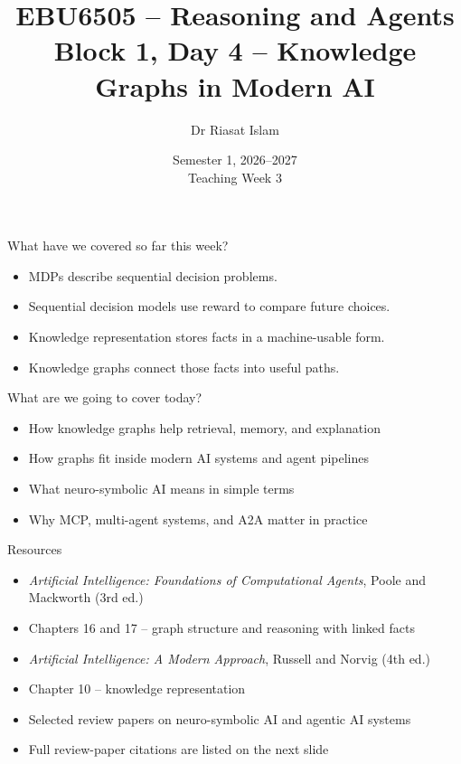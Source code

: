 \documentclass[aspectratio=169]{beamer}
\title[EBU6505 B1 D4]{EBU6505 -- Reasoning and Agents\\Block 1, Day 4 -- Knowledge Graphs in Modern AI}
\author{Dr Riasat Islam}
\institute{Queen Mary University of London}
\date[Teaching Week 3]{Semester 1, 2026--2027 \\ Teaching Week 3}
\newcommand{\defaultdeckrefs}{AIMA4e Ch.10 pp.314--343; Poole3e Ch.16--17 pp.701--766; doi:10.1016/j.cosrev.2026.100902}
\newcommand{\currentsliderefs}{\defaultdeckrefs}
\newcommand{\setslideref}[1]{\gdef\currentsliderefs{#1}}
\begin{document}
\setslideref{AIMA4e Ch.10 pp.314--343; Poole3e Ch.16--17 pp.701--766; doi:10.1016/j.cosrev.2026.100902}
\begin{frame}
  \titlepage
\end{frame}

\begin{frame}{What have we covered so far this week?}
\begin{itemize}
  \item MDPs describe sequential decision problems.
  \item Sequential decision models use reward to compare future choices.
  \item Knowledge representation stores facts in a machine-usable form.
  \item Knowledge graphs connect those facts into useful paths.
\end{itemize}
\end{frame}

\begin{frame}{What are we going to cover today?}
\begin{itemize}
  \item How knowledge graphs help retrieval, memory, and explanation
  \item How graphs fit inside modern AI systems and agent pipelines
  \item What neuro-symbolic AI means in simple terms
  \item Why MCP, multi-agent systems, and A2A matter in practice
\end{itemize}
\end{frame}

\begin{frame}{Resources}
\small
\begin{itemize}
  \item \textit{Artificial Intelligence: Foundations of Computational Agents}, Poole and Mackworth (3rd ed.)
  \item Chapters 16 and 17 -- graph structure and reasoning with linked facts
  \item \textit{Artificial Intelligence: A Modern Approach}, Russell and Norvig (4th ed.)
  \item Chapter 10 -- knowledge representation
  \item Selected review papers on neuro-symbolic AI and agentic AI systems
  \item Full review-paper citations are listed on the next slide
\end{itemize}
\end{frame}
\end{document}
